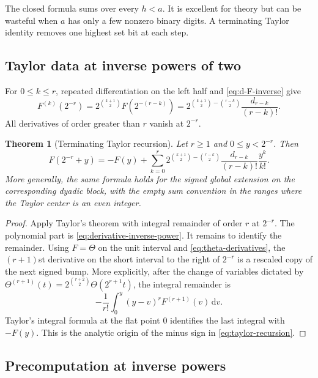 \documentclass[11pt]{article}
\numberwithin{equation}{section}
\newtheorem{theorem}{Theorem}[section]
\theoremstyle{definition}
\theoremstyle{remark}
\newcommand{\dd}{\,\mathrm{d}}
\newcommand{\Th}{\Theta}
\begin{document}
The closed formula sums over every $h<a$.  It is excellent for theory but can
be wasteful when $a$ has only a few nonzero binary digits.  A terminating
Taylor identity removes one highest set bit at each step.

\subsection{Taylor data at inverse powers of two}

For $0\le k\le r$, repeated differentiation on the left half and
\eqref{eq:d-F-inverse} give
\begin{equation}\label{eq:derivative-inverse-power}
 F^{(k)}(2^{-r})
 =2^{\binom{k+1}{2}}F(2^{-(r-k)})
 =2^{\binom{k+1}{2}-\binom{r-k}{2}}
   \frac{d_{r-k}}{(r-k)!}.
\end{equation}
All derivatives of order greater than $r$ vanish at $2^{-r}$.

\begin{theorem}[Terminating Taylor recursion]\label{thm:taylor-recursion}
Let $r\ge1$ and $0\le y<2^{-r}$.  Then
\begin{equation}\label{eq:taylor-recursion}
 F(2^{-r}+y)
 =-F(y)+\sum_{k=0}^{r}
 2^{\binom{k+1}{2}-\binom{r-k}{2}}
 \frac{d_{r-k}}{(r-k)!}\frac{y^k}{k!}.
\end{equation}
More generally, the same formula holds for the signed global extension on the
corresponding dyadic block, with the empty sum convention in the ranges where
the Taylor center is an even integer.
\end{theorem}

\begin{proof}
Apply Taylor's theorem with integral remainder of order $r$ at $2^{-r}$.
The polynomial part is \eqref{eq:derivative-inverse-power}.  It remains to
identify the remainder.  Using $F=\Th$ on the unit interval and
\eqref{eq:theta-derivatives}, the $(r+1)$st derivative on the short interval
to the right of $2^{-r}$ is a rescaled copy of the next signed bump.  More
explicitly, after the change of variables dictated by
$\Th^{(r+1)}(t)=2^{\binom{r+2}{2}}\Th(2^{r+1}t)$, the integral remainder is
\[
 -\frac1{r!}\int_0^y(y-v)^r F^{(r+1)}(v)\dd v.
\]
Taylor's integral formula at the flat point $0$ identifies the last integral
with $-F(y)$.  This is the analytic origin of the minus sign in
\eqref{eq:taylor-recursion}.
\end{proof}

\subsection{Precomputation at inverse powers}
\end{document}
